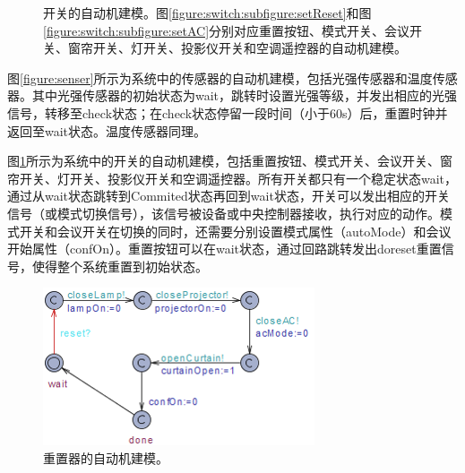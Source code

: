 \documentclass[journal, a4paper]{IEEEtran}
\begin{document}
\begin{figure}[t]
{        \label{figure:switch:subfigure:setLamp}
    }
    \caption{开关的自动机建模。图\ref{figure:switch:subfigure:setReset}和图\ref{figure:switch:subfigure:setAC}分别对应重置按钮、模式开关、会议开关、窗帘开关、灯开关、投影仪开关和空调遥控器的自动机建模。}
    \label{figure:switch}
\end{figure}

图\ref{figure:senser}所示为系统中的传感器的自动机建模，包括光强传感器和温度传感器。其中光强传感器的初始状态为wait，跳转时设置光强等级，并发出相应的光强信号，转移至check状态；在check状态停留一段时间（小于60s）后，重置时钟并返回至wait状态。温度传感器同理。

图\ref{figure:switch}所示为系统中的开关的自动机建模，包括重置按钮、模式开关、会议开关、窗帘开关、灯开关、投影仪开关和空调遥控器。所有开关都只有一个稳定状态wait，通过从wait状态跳转到Commited状态再回到wait状态，开关可以发出相应的开关信号（或模式切换信号），该信号被设备或中央控制器接收，执行对应的动作。模式开关和会议开关在切换的同时，还需要分别设置模式属性（autoMode）和会议开始属性（confOn）。重置按钮可以在wait状态，通过回路跳转发出doreset重置信号，使得整个系统重置到初始状态。

\begin{figure}
    \centering
    \includegraphics[width=0.7\columnwidth]{images/reset.png}
    \caption{重置器的自动机建模。}
    \label{figure:reset}
\end{figure}
\end{document}
